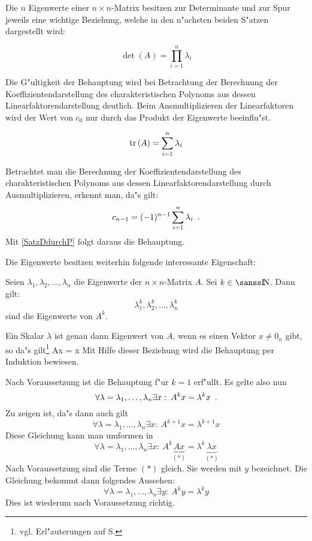 Die $n$ Eigenwerte einer $n \times n$-Matrix besitzen zur Determinante 
und zur Spur jeweils eine wichtige Beziehung, welche in den n"achsten 
beiden S"atzen dargestellt wird:
\begin{satz}
    \[ \det(A)= \prod_{i=1}^{n} \lambda_i \]
\end{satz}
\begin{beweis}
    Die G"ultigkeit der Behauptung wird bei Betrachtung der Berechnung der
    Koeffizientendarstellung des charakteristischen Polynoms aus dessen
    Linearfaktorendarstellung deutlich. Beim Ausmultiplizieren der 
    Linearfaktoren wird der Wert von $c_0$ nur durch das Produkt der 
    Eigenwerte beeinflu"st.
\end{beweis}

\begin{satz}
\label{SatzTrEigenwerte}
    \[ \mbox{\rm tr} \,(A)= \sum_{i=1}^{n} \lambda_i \]
\end{satz}
\begin{beweis}
    Betrachtet man die Berechnung der Koeffizientendarstellung des
    charakteristischen Polynoms aus dessen Linearfaktorendarstellung durch
    Ausmultiplizieren, erkennt man, da"s gilt:
    \[ c_{n-1} = (-1)^{n-1} \sum_{i=1}^n \lambda_i \mbox{\hspace{0.5em}.} \]
    Mit \ref{SatzDdurchP} folgt daraus die Behauptung.
\end{beweis}

Die Eigenwerte besitzen weiterhin folgende interessante Eigenschaft:
\begin{satz}
\label{SatzEigenPotenz}
    Seien $\lambda_1, \lambda_2, \ldots, \lambda_n$ die Eigenwerte der
    $n \times n$-Matrix $A$. Sei $k \in \Nat$. Dann gilt:
    \[ \lambda_1^k, \lambda_2^k, \ldots, \lambda_n^k \] sind die
    Eigenwerte von $A^k$.
\end{satz}
\begin{beweis}
    Ein Skalar $\lambda$ ist genau dann Eigenwert von $A$, wenn es einen
    Vektor $x \neq 0_n$ gibt, so da"s gilt\footnote{vgl. 
    Erl"auterungen auf S. \pageref{PageEigenMotiv}}
        Ax = \lambda x \MyPunkt
    \Eeq
    Mit Hilfe dieser Beziehung wird die Behauptung per Induktion
    bewiesen.

    Nach Voraussetzung ist die Behauptung f"ur $k=1$ erf"ullt. Es gelte
    also nun
    \[ \forall \lambda= \lambda_1, \ldots, \lambda_n \exists x : \:
       A^k x = \lambda^k x \mbox{\hspace{0.5em}.}
    \]
    Zu zeigen ist, da"s dann auch gilt
    \[ \forall \lambda= \lambda_1, \ldots, \lambda_n \exists x : \:
       A^{k+1} x = \lambda^{k+1} x
    \]
    Diese Gleichung kann man umformen in
    \[ \forall \lambda= \lambda_1, \ldots, \lambda_n \exists x : \:
       A^k \underbrace{A x}_{(*)}= \lambda^k \underbrace{\lambda x}_{(*)}
    \]
    Nach Voraussetzung sind die Terme $(*)$ gleich. Sie werden mit $y$ 
    bezeichnet. Die Gleichung bekommt dann folgendes Aussehen:
    \[ \forall \lambda= \lambda_1, \ldots, \lambda_n \exists y: \:
       A^k y= \lambda^k y
    \]
    Dies ist wiederum nach Voraussetzung richtig.
\end{beweis}

